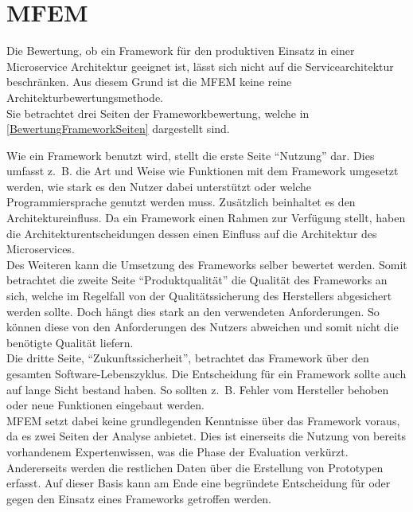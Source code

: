 \section{\acf*{MFEM}}\label{MFEM}

Die Bewertung, ob ein Framework für den produktiven Einsatz in einer Microservice Architektur geeignet ist, lässt sich nicht auf die Servicearchitektur beschränken. Aus diesem Grund ist die \ac{MFEM} keine reine Architekturbewertungsmethode.\\ 
Sie betrachtet drei Seiten der Frameworkbewertung, welche in \ref{BewertungFrameworkSeiten} dargestellt sind.


Wie ein Framework benutzt wird, stellt die erste Seite \enquote{Nutzung} dar. Dies umfasst z.~B. die Art und Weise wie Funktionen mit dem Framework umgesetzt werden, wie stark es den Nutzer dabei unterstützt oder welche Programmiersprache genutzt werden muss. Zusätzlich beinhaltet es den Architektureinfluss. Da ein Framework einen Rahmen zur Verfügung stellt, haben die Architekturentscheidungen dessen einen Einfluss auf die Architektur des Microservices.\\
Des Weiteren kann die Umsetzung des Frameworks selber bewertet werden. Somit betrachtet die zweite Seite \enquote{Produktqualität} die Qualität des Frameworks an sich, welche im Regelfall von der Qualitätssicherung des Herstellers abgesichert werden sollte. Doch hängt dies stark an den verwendeten Anforderungen. So können diese von den Anforderungen des Nutzers abweichen und somit nicht die benötigte Qualität liefern.\\
Die dritte Seite, \enquote{Zukunftssicherheit}, betrachtet das Framework über den gesamten Software-Lebenszyklus. Die Entscheidung für ein Framework sollte auch auf lange Sicht bestand haben. So sollten z.~B. Fehler vom Hersteller behoben oder neue Funktionen eingebaut werden.\\

\ac{MFEM} setzt dabei keine grundlegenden Kenntnisse über das Framework voraus, da es zwei Seiten der Analyse anbietet. Dies ist einerseits die Nutzung von bereits vorhandenem Expertenwissen, was die Phase der Evaluation verkürzt. Andererseits werden die restlichen Daten über die Erstellung von Prototypen erfasst.
Auf dieser Basis kann am Ende eine begründete Entscheidung für oder gegen den Einsatz eines Frameworks getroffen werden.

